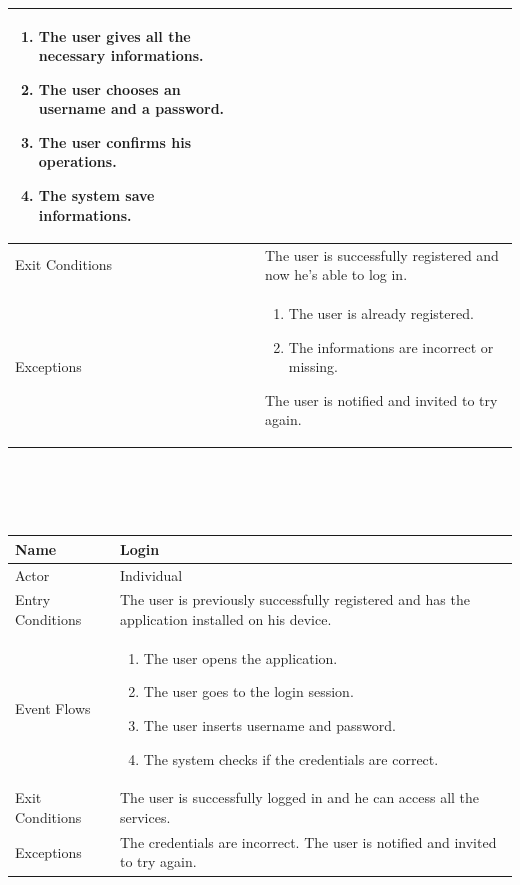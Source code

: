\documentclass{article}
\begin{document}
\begin{legal}
\begin{legal}
\begin{legal}
\begin{tabular}{| m{3.5cm} | m{8cm}| }
\begin{enumerate}
									\item The user gives all the necessary informations.
									\item The user chooses an username and a password.
									\item The user confirms his operations.
									\item The system save informations.
				\end{enumerate}\\
				\hline
					Exit Conditions & The user is successfully  registered and now he's able to log in.\\
				\hline
					Exceptions & \begin{enumerate}
									  \item The user is already registered.
									  \item The informations are incorrect or
									   missing.
				\end{enumerate}
				The user is notified and invited to try again.\\
				\hline
				\end{tabular}
				\\\\\\
				\begin{tabular}{| m{3.5cm} | m{8cm}| }
				\hline
					Name & Login\\
				\hline
					Actor & Individual\\
				\hline
					Entry Conditions & The user is previously successfully registered and has the application installed
				on his device.\\
				\hline
					Event Flows & \begin{enumerate}
									  \item The user opens the application.
									  \item The user goes to the login session.
									  \item The user inserts username and password.
									  \item The system checks if the credentials are correct.
				\end{enumerate}\\
				\hline
					Exit Conditions & The user is successfully logged in and he can access all the services. \\
				\hline
					Exceptions & The credentials are incorrect. The user is notified and invited to try again.\\
				\hline
				\end{tabular}\\\\\\

\end{legal}
\end{legal}
\end{legal}
\end{document}
